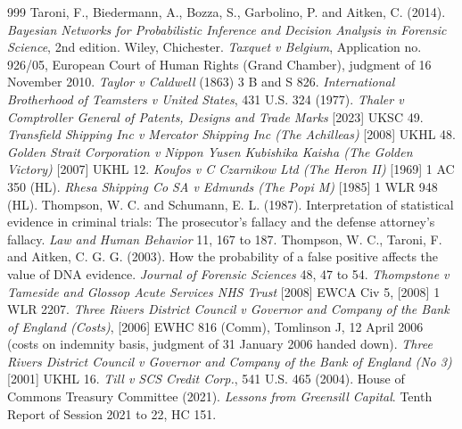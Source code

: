 \begin{thebibliography}{999}
 Taroni, F., Biedermann, A., Bozza, S., Garbolino, P. and Aitken, C. (2014). \emph{Bayesian Networks for Probabilistic Inference and Decision Analysis in Forensic Science}, 2nd edition. Wiley, Chichester.
 \emph{Taxquet v Belgium}, Application no. 926/05, European Court of Human Rights (Grand Chamber), judgment of 16 November 2010.
 \emph{Taylor v Caldwell} (1863) 3 B and S 826.
 \emph{International Brotherhood of Teamsters v United States}, 431 U.S. 324 (1977).
 \emph{Thaler v Comptroller General of Patents, Designs and Trade Marks} [2023] UKSC 49.
 \emph{Transfield Shipping Inc v Mercator Shipping Inc (The Achilleas)} [2008] UKHL 48.
 \emph{Golden Strait Corporation v Nippon Yusen Kubishika Kaisha (The Golden Victory)} [2007] UKHL 12.
 \emph{Koufos v C Czarnikow Ltd (The Heron II)} [1969] 1 AC 350 (HL).
 \emph{Rhesa Shipping Co SA v Edmunds (The Popi M)} [1985] 1 WLR 948 (HL).
 Thompson, W. C. and Schumann, E. L. (1987). Interpretation of statistical evidence in criminal trials: The prosecutor's fallacy and the defense attorney's fallacy. \emph{Law and Human Behavior} 11, 167 to 187.
 Thompson, W. C., Taroni, F. and Aitken, C. G. G. (2003). How the probability of a false positive affects the value of DNA evidence. \emph{Journal of Forensic Sciences} 48, 47 to 54.
 \emph{Thompstone v Tameside and Glossop Acute Services NHS Trust} [2008] EWCA Civ 5, [2008] 1 WLR 2207.
 \emph{Three Rivers District Council v Governor and Company of the Bank of England (Costs)}, [2006] EWHC 816 (Comm), Tomlinson J, 12 April 2006 (costs on indemnity basis, judgment of 31 January 2006 handed down).
 \emph{Three Rivers District Council v Governor and Company of the Bank of England (No 3)} [2001] UKHL 16.
 \emph{Till v SCS Credit Corp.}, 541 U.S. 465 (2004).
 House of Commons Treasury Committee (2021). \emph{Lessons from Greensill Capital}. Tenth Report of Session 2021 to 22, HC 151.

\end{thebibliography}
